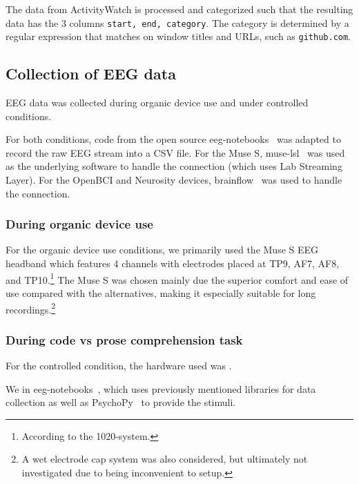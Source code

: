 \documentclass[a4paper]{article}
\begin{document}
\begin{refsection}
        The data from ActivityWatch is processed and categorized such that the resulting data has the 3 columns \texttt{start, end, category}. The category is determined by a regular expression that matches on window titles and URLs, such as \texttt{github.com}.

    \subsection{Collection of EEG data}

        EEG data was collected during organic device use and under controlled conditions.

        For both conditions, code from the open source eeg-notebooks~\cite{noauthor_neurotechxeeg-notebooks_2020} was adapted to record the raw EEG stream into a CSV file. For the Muse S, muse-lsl~\cite{muse-lsl} was used as the underlying software to handle the connection (which uses Lab Streaming Layer). For the OpenBCI and Neurosity devices, brainflow~\cite{noauthor_brainflow-devbrainflow_2020} was used to handle the connection.

        \subsubsection{During organic device use}

            For the organic device use conditions, we primarily used the Muse S EEG headband which features 4 channels with electrodes placed at TP9, AF7, AF8, and TP10.\footnote{According to the 1020-system.} The Muse S was chosen mainly due the superior comfort and ease of use compared with the alternatives, making it especially suitable for long recordings.\footnote{A wet electrode cap system was also considered, but ultimately not investigated due to being inconvenient to setup.}

        \subsubsection{During code vs prose comprehension task}

            For the controlled condition, the hardware used was .

            We  in eeg-notebooks~\cite{noauthor_neurotechxeeg-notebooks_2020}, which uses previously mentioned libraries for data collection as well as PsychoPy~\cite{peirce_psychopy2_2019} to provide the stimuli.


\end{refsection}
\end{document}
